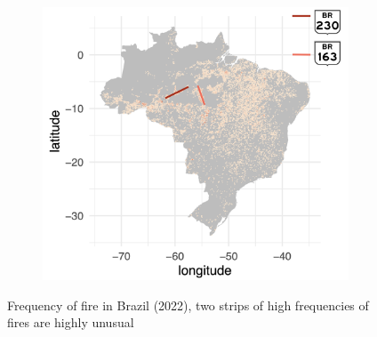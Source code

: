 \documentclass{article}\usepackage[]{graphicx}\usepackage[]{xcolor}
\newenvironment{knitrout}{}{} %
\begin{document}
\begin{figure}[htbp]
\begin{minipage}[b]{0.48\linewidth}
\begin{knitrout}
\end{knitrout}
  \end{minipage}
  \hfill
  \begin{minipage}[b]{0.48\linewidth}
\begin{figure}[H]
    \centering
    \includegraphics[width=1\linewidth]{image_reference/mapshoot.png}
\end{figure}
  \end{minipage}
  \caption{Frequency of fire in Brazil (2022), two strips of high frequencies of fires are highly unusual}
  \label{fig:fire22}
\end{figure}
\end{document}
